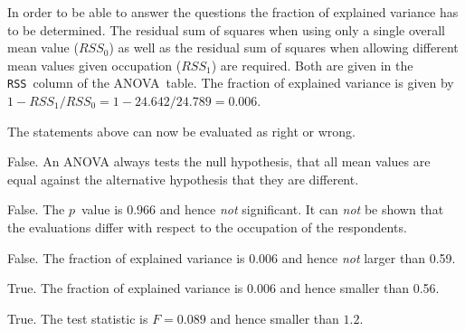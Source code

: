 \begin{solution}
In order to be able to answer the questions the fraction of
explained variance has to be determined. The residual sum of squares
when using only a single overall mean value ($\mathit{RSS}_0$) as
well as the residual sum of squares when allowing different mean
values given occupation ($\mathit{RSS}_1$) are required. Both are
given in the \texttt{RSS}~column of the ANOVA~table.  The
fraction of explained variance is given by $1 -
\mathit{RSS}_1/\mathit{RSS}_0 = 1 - 24.642/24.789 =
0.006$.  

The statements above can now be evaluated as right or wrong.

\begin{answerlist}
  \item False. An ANOVA always tests the null hypothesis, that all mean values are equal against the alternative hypothesis that they are different.
  \item False. The $p$~value is $ 0.966 $ and hence \textit{not} significant. It can  \textit{not} be shown that the evaluations differ with respect to the occupation of the respondents.
  \item False. The fraction of explained variance is $0.006$ and hence \textit{not} larger than 0.59.
  \item True. The fraction of explained variance is $0.006$ and hence  smaller than 0.56.
  \item True. The test statistic is $F = 0.089$ and hence  smaller than $1.2$.
\end{answerlist}
\end{solution}


